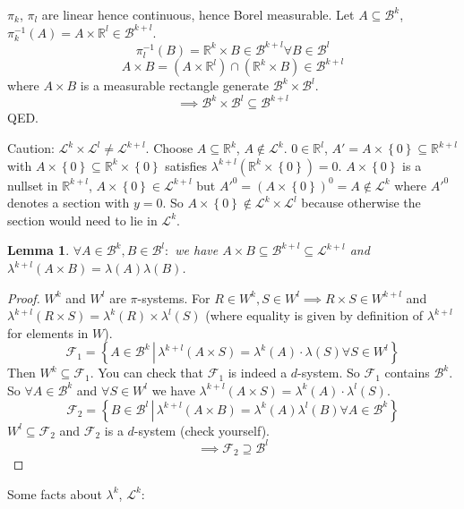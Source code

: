 \documentclass{article}
\newtheorem{lemma}{Lemma}  \numberwithin{lemma}{section}
\newcommand{\set}[1]{\left\{#1\right\}}
\newcommand{\setdef}[2]{\left\{\left.#1\,\right|\,#2\right\}}
\begin{document}
$\pi_k$, $\pi_l$ are linear hence continuous, hence Borel measurable.
Let $A \subseteq \mathcal B^k$, $\pi_k^{-1}(A) = A \times \mathbb R^l \in \mathcal B^{k + l}$.
\[ \pi_l^{-1}(B) = \mathbb R^k \times B \in \mathcal B^{k + l} \forall B \in \mathcal B^l \]
\[ A \times B = (A \times \mathbb R^l) \cap (\mathbb R^k \times B) \in \mathcal B^{k+l} \]
where $A \times B$ is a measurable rectangle generate $\mathcal B^k \times \mathcal B^l$.
\[ \implies \mathcal B^k \times \mathcal B^l \subseteq \mathcal B^{k+l} \]
QED.

Caution: $\mathcal L^k \times \mathcal L^l \neq \mathcal L^{k+l}$.
Choose $A \subseteq \mathbb R^k$, $A \not\in \mathcal L^k$. $0 \in \mathbb R^l$, $A' = A \times \set{0} \subseteq \mathbb R^{k+l}$
with $A \times \set{0} \subseteq \mathbb R^k \times \set{0}$ satisfies $\lambda^{k+l}(\mathbb R^k \times \set{0}) = 0$.
$A \times \set{0}$ is a nullset in $\mathbb R^{k+l}$, $A \times \set{0} \in \mathcal L^{k+l}$
but $A'^0 = (A \times \set{0})^0 = A \not\in \mathcal L^k$ where $A'^0$ denotes a section with $y=0$.
So $A \times \set{0} \not\in \mathcal L^k \times \mathcal L^l$ because otherwise the section would need to lie in $\mathcal L^k$.

\begin{lemma}
  $\forall A \in \mathcal B^k, B \in \mathcal B^l:$ we have $A \times B \subseteq \mathcal B^{k+l} \subseteq \mathcal L^{k + l}$
  and $\lambda^{k+l}(A \times B) = \lambda(A) \lambda(B)$.
\end{lemma}
\begin{proof}
  $W^k$ and $W^l$ are $\pi$-systems. For $R \in W^k, S \in W^l \implies R \times S \in W^{k+l}$ and $\lambda^{k+l}(R \times S) = \lambda^k(R) \times \lambda^l(S)$
  (where equality is given by definition of $\lambda^{k+l}$ for elements in $W$).
  \[ \mathcal F_1 = \setdef{A \in \mathcal B^k}{\lambda^{k+l}(A \times S) = \lambda^k(A) \cdot \lambda(S) \forall S \in W^l} \]
  Then $W^k \subseteq \mathcal F_1$. You can check that $\mathcal F_1$ is indeed a $d$-system.
  So $\mathcal F_1$ contains $\mathcal B^k$. So $\forall A \in \mathcal B^k$ and $\forall S \in W^l$ we have $\lambda^{k+l}(A \times S) = \lambda^k(A) \cdot \lambda^l(S)$.
  \[ \mathcal F_2 = \setdef{B \in \mathcal B^l}{\lambda ^{k+l}(A \times B) = \lambda^k(A) \lambda^l(B) \forall A \in \mathcal B^k} \]
  $W^l \subseteq \mathcal F_2$ and $\mathcal F_2$ is a $d$-system (check yourself).
  \[ \implies \mathcal F_2 \supseteq \mathcal B^l \]
\end{proof}

Some facts about $\lambda^k$, $\mathcal L^k$:
\end{document}
